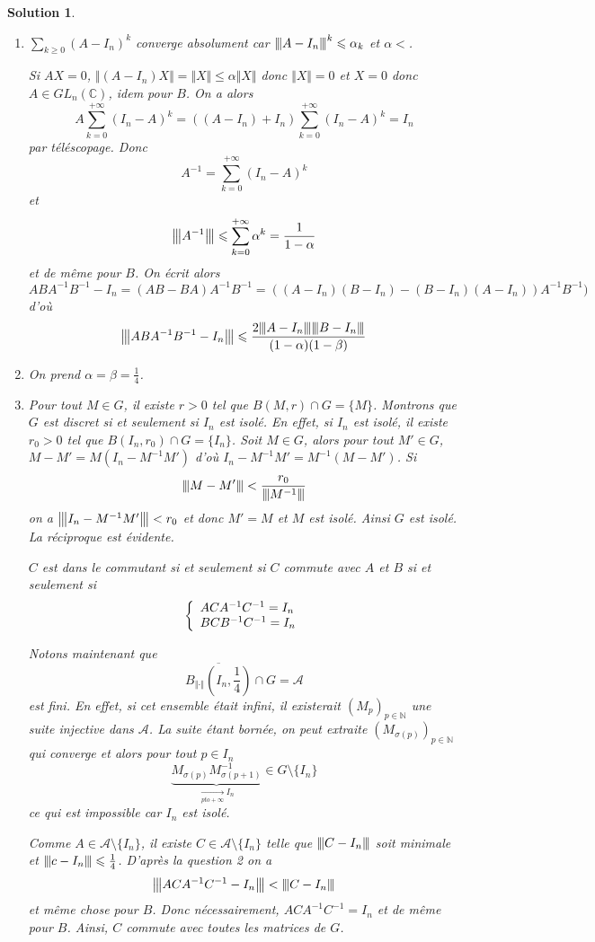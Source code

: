\documentclass[12pt]{article}
\newtheorem{solution}{Solution}[section]
\theoremstyle{remark}
\newcommand{\C}{\mathbb{C}} \newcommand{\Q}{\mathbb{Q}}
\newcommand{\N}{\mathbb{N}} \newcommand{\Z}{\mathbb{Z}}
\newcommand{\vertiii}[1]{{\left\vert\kern-0.25ex\left\vert\kern-0.25ex\left\vert{}#1
\right\vert\kern-0.25ex\right\vert\kern-0.25ex\right\vert}}
\numberwithin{equation}{section}
\begin{document}
\begin{solution}
	\phantom{}
	\begin{enumerate}
		\item $\sum_{k\geqslant0}(A-I_{n})^{k}$ converge absolument car $\vertiii{A-I_{n}}^{k}\leqslant\alpha_{k}$ et $\alpha<$.
		
		Si $AX=0$, $\Vert (A-I_{n})X\Vert=\Vert X\Vert\leqslant\alpha\Vert X\Vert$ donc $\Vert X\Vert=0$ et $X=0$ donc $A\in GL_{n}(\C)$, idem pour $B$. On a alors
		\begin{equation*}
			A\sum_{k=0}^{+\infty}(I_{n}-A)^{k}=((A-I_{n})+I_{n})\sum_{k=0}^{+\infty}(I_{n}-A)^{k}=I_{n}
		\end{equation*}
		par téléscopage. Donc 
		$$A^{-1}=\sum_{k=0}^{+\infty}(I_{n}-A)^{k}$$
		et
		$$\vertiii{A^{-1}}\leqslant\sum_{k=0}^{+\infty}\alpha^{k}=\frac{1}{1-\alpha}$$
		et de même pour $B$. On écrit alors
		$$ABA^{-1}B^{-1}-I_{n}=(AB-BA)A^{-1}B^{-1}=((A-I_{n})(B-I_{n})-(B-I_{n})(A-I_{n}))A^{-1}B^{-1})$$
		d'où
		$$\vertiii{ABA^{-1}B^{-1}-I_{n}}\leqslant\frac{2\vertiii{A-I_{n}}\vertiii{B-I_{n}}}{(1-\alpha)(1-\beta)}$$

		\item On prend $\alpha=\beta=\frac{1}{4}$.
		\item Pour tout $M\in G$, il existe $r>0$ tel que $B(M,r)\cap G=\{M\}$. Montrons que $G$ est discret si et seulement si $I_{n}$ est isolé. En effet, si $I_{n}$ est isolé, il existe $r_{0}>0$ tel que $B(I_{n},r_{0})\cap G=\{I_{n}\}$. Soit $M\in G$, alors pour tout $M'\in G$, $M-M'=M(I_{n}-M^{-1}M')$ d'où $I_{n}-M^{-1}M'=M^{-1}(M-M')$. Si 
		$$\vertiii{M-M'}<\frac{r_{0}}{\vertiii{M^{-1}}}$$
		on a $\vertiii{I_{n}-M^{-1}M'}<r_{0}$ et donc $M'=M$ et $M$ est isolé. Ainsi $G$ est isolé. La réciproque est évidente.

		$C$ est dans le commutant si et seulement si $C$ commute avec $A$ et $B$ si et seulement si
		$$
		\left\{
			\begin{array}[]{l}
				ACA^{-1}C^{-1}=I_{n}\\
				BCB^{-1}C^{-1}=I_{n}
			\end{array}
		\right.
		$$

		Notons maintenant que 
		$$\overline{B_{\Vert\cdot\Vert}(I_{n},\frac{1}{4})}\cap G=\mathcal{A}$$
		est fini. En effet, si cet ensemble était infini, il existerait $(M_{p})_{p\in\N}$ une suite injective dans $\mathcal{A}$. La suite étant bornée, on peut extraite $(M_{\sigma(p)})_{p\in\N}$ qui converge et alors pour tout $p\in I_{n}$
		$$\underbrace{M_{\sigma(p)}M_{\sigma(p+1)}^{-1}}_{\xrightarrow[pto+\infty]{}I_{n}}\in G\setminus\{I_{n}\}$$
		ce qui est impossible car $I_{n}$ est isolé.

		Comme $A\in \mathcal{A}\setminus\{I_{n}\}$, il existe $C\in\mathcal{A}\setminus\{I_{n}\}$ telle que $\vertiii{C-I_{n}}$ soit minimale et $\vertiii{c-I_{n}}\leqslant\frac{1}{4}$. D'après la question 2 on a 
		$$\vertiii{ACA^{-1}C^{-1}-I_{n}}<\vertiii{C-I_{n}}$$
		et même chose pour $B$. Donc nécessairement, $ACA^{-1}C^{-1}=I_{n}$ et de même pour $B$. Ainsi, $C$ commute avec toutes les matrices de $G$.
	\end{enumerate}
\end{solution}
\end{document}
